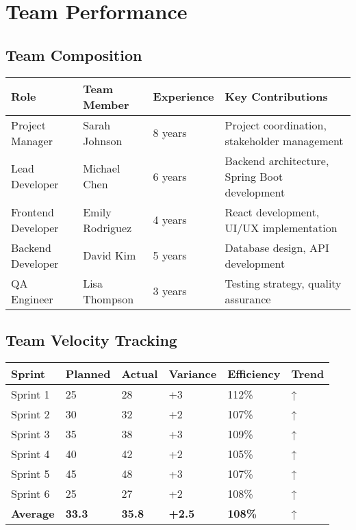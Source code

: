\documentclass[12pt,a4paper]{article}
\begin{document}
\section{Team Performance}

\subsection{Team Composition}
\begin{longtable}{|p{3cm}|p{3cm}|p{3cm}|p{5cm}|}
\hline
\rowcolor{lightgray}
\textbf{Role} & \textbf{Team Member} & \textbf{Experience} & \textbf{Key Contributions} \\
\hline
Project Manager & Sarah Johnson & 8 years & Project coordination, stakeholder management \\
\hline
Lead Developer & Michael Chen & 6 years & Backend architecture, Spring Boot development \\
\hline
Frontend Developer & Emily Rodriguez & 4 years & React development, UI/UX implementation \\
\hline
Backend Developer & David Kim & 5 years & Database design, API development \\
\hline
QA Engineer & Lisa Thompson & 3 years & Testing strategy, quality assurance \\
\hline
\end{longtable}

\subsection{Team Velocity Tracking}
\begin{longtable}{|p{2cm}|p{2cm}|p{2cm}|p{2cm}|p{2cm}|p{2cm}|}
\hline
\rowcolor{lightgray}
\textbf{Sprint} & \textbf{Planned} & \textbf{Actual} & \textbf{Variance} & \textbf{Efficiency} & \textbf{Trend} \\
\hline
Sprint 1 & 25 & 28 & +3 & 112\% & \cellcolor{completedgreen}↑ \\
\hline
Sprint 2 & 30 & 32 & +2 & 107\% & \cellcolor{completedgreen}↑ \\
\hline
Sprint 3 & 35 & 38 & +3 & 109\% & \cellcolor{completedgreen}↑ \\
\hline
Sprint 4 & 40 & 42 & +2 & 105\% & \cellcolor{completedgreen}↑ \\
\hline
Sprint 5 & 45 & 48 & +3 & 107\% & \cellcolor{completedgreen}↑ \\
\hline
Sprint 6 & 25 & 27 & +2 & 108\% & \cellcolor{completedgreen}↑ \\
\hline
\textbf{Average} & \textbf{33.3} & \textbf{35.8} & \textbf{+2.5} & \textbf{108\%} & \cellcolor{completedgreen}↑ \\
\hline
\end{longtable}
\end{document}
